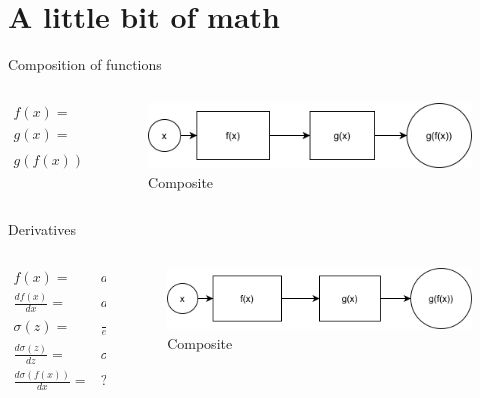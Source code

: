 \section{A little bit of math}

\begin{frame}{Composition of functions} 
	\begin{columns}
		\begin{column}{.5\textwidth} 
			\begin{align}
				f(x)=& ax+b \\
				g(x)=&  \frac{1}{e^{-x}+1} \\
				g(f(x)) =& \frac{1}{e^{-(ax+b)}+1}   
			\end{align}
		\end{column}
		\begin{column}{.5\textwidth}
			\begin{figure}
				\includegraphics[width=.8\textwidth, center]{figures/function_composition}
				\caption*{Composite}
			\end{figure}
		\end{column}
	\end{columns}
\end{frame}

\begin{frame}{Derivatives}
	\begin{columns}
		\begin{column}{.5\textwidth}
			\begin{align}
				f(x)=&ax+b \\
				\frac{df(x)}{dx} =& a \\
				\sigma(z) =&\frac{1}{e^{-z}+1} \\
				\frac{d\sigma(z)}{dz} =& \sigma(z)(1-\sigma(z)) \\
				\frac{d\sigma(f(x))}{dx}=&?
			\end{align}
		\end{column}
		\begin{column}{.5\textwidth}
			\begin{figure}
				\includegraphics[width=.8\textwidth, center]{figures/function_composition}
				\caption*{Composite}
			\end{figure}
		\end{column}
	\end{columns}
\end{frame}

